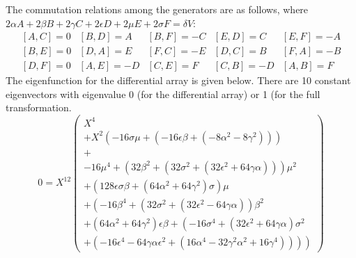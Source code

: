 \documentclass[12pt]{article}
\begin{document}
 The commutation relations among the generators are as follows,
where $2\alpha A + 2\beta B + 2\gamma C + 2\epsilon D + 2\mu E + 2\sigma F =
\delta V$:
\begin{displaymath}
\begin{array}{ccccc}
 \left[ A,C\right] = 0 & \left[ B,D \right] = A &  \left[ B,F \right] = -C &
 \left[ E,D\right] = C  &  \left[ E,F\right] = -A \\
 \left[ B,E\right] = 0 &  \left[ D,A\right] = E & \left[ F,C \right] = -E &
 \left[ D,C\right] = B &  \left[ F,A \right] = -B \\
 \left[ D,F\right] = 0 &  \left[ A,E \right] = -D &  \left[ C,E\right] = F &
 \left[ C,B\right] = -D & \left[ A,B\right] = F
\end{array}
\end{displaymath}
 The eigenfunction for the differential array is given below.  There are
10 constant eigenvectors with eigenvalue 0 (for the differential array)
or 1 (for the full transformation.
\begin{displaymath}
0 = X^{12} \left( 
\begin{array}{c}
X^4 \\ 
+X^2  \left(-16\sigma\mu + \left(-16\epsilon\beta + 
\left(-8\alpha^2 - 8\gamma^2\right)\right)\right) \\ 
+ \\
-16\mu^4 + \left(32\beta^2 + \left(32\sigma^2 + 
\left(32\epsilon^2 + 64\gamma\alpha\right)\right)\right)\mu^2 \\
+ \left(128\epsilon\sigma\beta + 
\left(64\alpha^2 + 64\gamma^2\right)\sigma\right)\mu \\
+ \left(-16\beta^4 + \left(32\sigma^2 + 
\left(32\epsilon^2 - 64\gamma\alpha\right)\right)\beta^2 \right. \\
+ \left(64\alpha^2 + 64\gamma^2\right)\epsilon\beta + \left(-16\sigma^4 + 
\left(32\epsilon^2 + 64\gamma\alpha\right)\sigma^2 \right. \\
+ \left. \left. \left(-16\epsilon^4 - 64\gamma\alpha\epsilon^2 +
\left(16\alpha^4 - 32\gamma^2\alpha^2 + 
16\gamma^4\right)\right)\right)\right)
\end{array} \right)
\end{displaymath}
\end{document}
